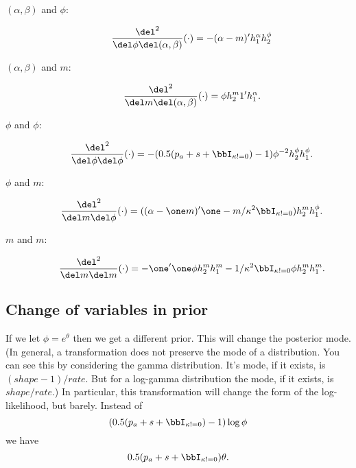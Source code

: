 \documentclass[]{article}
\newcommand{\hessdel}[2]{\frac{\del^2}{\del #1 \del #2}}
\begin{document}
\begin{description}
\item[$(\alpha,\beta)$ and $\phi$:]
\[
\hessdel{\phi}{(\alpha, \beta)} (\cdot) = -(\alpha-m)' h^{\alpha}_1 h^{\phi}_2
\]

\item[$(\alpha, \beta)$ and $m$:]
\[
\hessdel{m}{(\alpha, \beta)} (\cdot) = \phi h^{m}_2 1' h^{\alpha}_1.
\]

\item[$\phi$ and $\phi$:]
\[
\hessdel{\phi}{\phi} (\cdot) =  - (0.5 (p_a + s + \bbI_{\kappa != 0}) - 1) \phi^{-2}
h^{\phi}_2 h^{\phi}_1.
\]

\item[$\phi$ and $m$:]
\[
\hessdel{m}{\phi} (\cdot) = ( (\alpha - \one m)' \one - m / \kappa^2
\bbI_{\kappa != 0}) h^{m}_2 h^{\phi}_1.
\]

\item[$m$ and $m$:]
\[
\hessdel{m}{m} (\cdot) = -\one' \one \phi h^{m}_2 h^{m}_1 - 1/\kappa^2 \bbI_{\kappa !=
  0} \phi h^{m}_2 h^{m}_1.
\]

\end{description}

\subsection{Change of variables in prior}

If we let $\phi = e^\theta$ then we get a different prior.  This will change the
posterior mode.  (In general, a transformation does not preserve the mode of a
distribution.  You can see this by considering the gamma distribution.  It's
mode, if it exists, is $(shape - 1) / rate$.  But for a log-gamma distribution
the mode, if it exists, is $shape / rate$.)  In particular, this transformation
will change the form of the log-likelihood, but barely.  Instead of
\[
(0.5 (p_a + s + \bbI_{\kappa != 0}) - 1) \log \phi
\]
we have
\[
0.5 (p_a + s + \bbI_{\kappa != 0}) \theta.
\]

{}

\end{document}
